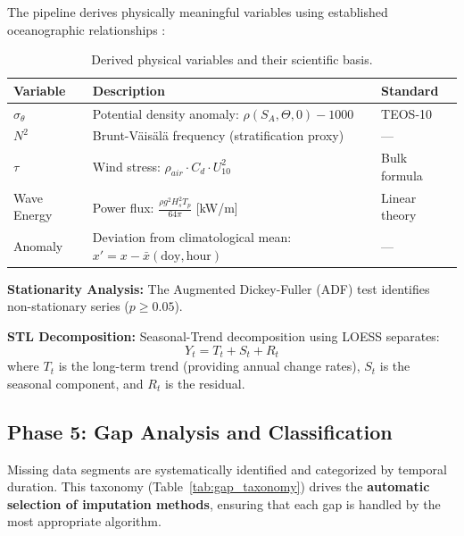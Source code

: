 \documentclass[12pt,a4paper]{article}
\begin{document}
The pipeline derives physically meaningful variables using established oceanographic relationships \cite{teos10}:

\begin{table}[H]
\centering
\caption{Derived physical variables and their scientific basis.}
\label{tab:derived_vars}
\begin{tabularx}{\textwidth}{@{}lXl@{}}
\toprule
\textbf{Variable} & \textbf{Description} & \textbf{Standard} \\ \midrule
$\sigma_\theta$ & Potential density anomaly: $\rho(S_A, \Theta, 0) - 1000$ & TEOS-10 \\
$N^2$ & Brunt-Väisälä frequency (stratification proxy) & — \\
$\tau$ & Wind stress: $\rho_{air} \cdot C_d \cdot U_{10}^2$ & Bulk formula \\
Wave Energy & Power flux: $\frac{\rho g^2 H_s^2 T_p}{64\pi}$ [kW/m] & Linear theory \\
Anomaly & Deviation from climatological mean: $x' = x - \bar{x}(\text{doy}, \text{hour})$ & — \\
\bottomrule
\end{tabularx}
\end{table}

\textbf{Stationarity Analysis:} The Augmented Dickey-Fuller (ADF) test identifies non-stationary series ($p \geq 0.05$).

\textbf{STL Decomposition:} Seasonal-Trend decomposition using LOESS \cite{cleveland1990stl} separates:
\begin{equation}
    Y_t = T_t + S_t + R_t
\end{equation}
where $T_t$ is the long-term trend (providing annual change rates), $S_t$ is the seasonal component, and $R_t$ is the residual.

\newpage
\subsection{Phase 5: Gap Analysis and Classification}
\label{sec:gap_analysis}

Missing data segments are systematically identified and categorized by temporal duration. This taxonomy (Table~\ref{tab:gap_taxonomy}) drives the \textbf{automatic selection of imputation methods}, ensuring that each gap is handled by the most appropriate algorithm.
\end{document}
